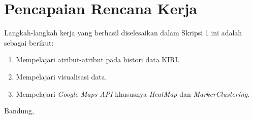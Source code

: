 \documentclass[a4paper,twoside]{article}
\begin{document}
\section{Pencapaian Rencana Kerja}
Langkah-langkah kerja yang berhasil diselesaikan dalam Skripsi 1 ini adalah sebagai berikut:
\begin{enumerate}
\item Mempelajari atribut-atribut pada histori data KIRI.
\item Mempelajari visualisasi data.
\item Mempelajari \textit{Google Maps API}  khususnya \textit{HeatMap} dan \textit{MarkerClustering}.
\end{enumerate}




\vspace{6cm}
\centering Bandung, \tanggal\\
\vspace{2cm} \nama \\ 
\vspace{1cm}

\end{document}

